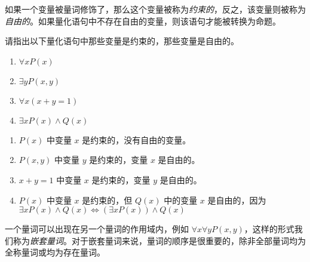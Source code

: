 如果一个变量被量词修饰了，那么这个变量被称为\emph{约束的}，反之，该变量则被称为\emph{自由的}。如果量化语句中不存在自由的变量，则该语句才能被转换为命题。
\begin{collections}
    \begin{example}
        请指出以下量化语句中那些变量是约束的，那些变量是自由的。
        \begin{enumerate}
            \item $\forall x P(x)$
            \item $\exists y P(x, y)$
            \item $\forall x (x + y = 1)$
            \item $\exists x P(x) \land Q(x)$
        \end{enumerate}
    \end{example}

    \begin{solution}
        \begin{enumerate}
            \item $P(x)$ 中变量 $x$ 是约束的，没有自由的变量。
            \item $P(x, y)$ 中变量 $y$ 是约束的，变量 $x$ 是自由的。
            \item $x + y = 1$ 中变量 $x$ 是约束的，变量 $y$ 是自由的。
            \item $P(x)$ 中变量 $x$ 是约束的，但 $Q(x)$ 中的变量 $x$ 是自由的，因为 $\exists x P(x) \land Q(x) \iff (\exists x P(x)) \land Q(x)$
        \end{enumerate}
    \end{solution}
\end{collections}

一个量词可以出现在另一个量词的作用域内，例如 $\forall x \forall y P(x,y)$，这样的形式我们称为\emph{嵌套量词}。对于嵌套量词来说，量词的顺序是很重要的，除非全部量词均为全称量词或均为存在量词。

